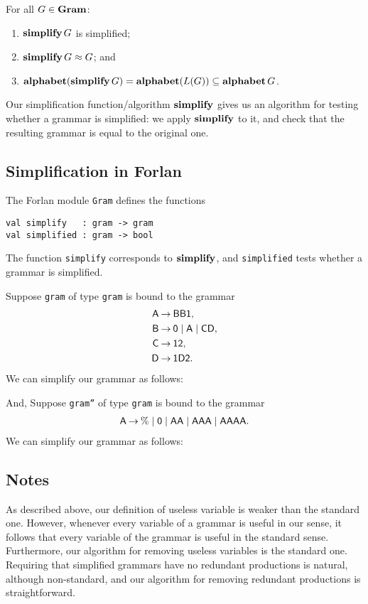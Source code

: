 \begin{theorem}
For all $G\in\mathbf{Gram}$:
\begin{enumerate}[\quad(1)]
\item $\mathbf{simplify}\,G$ is simplified;

\item $\mathbf{simplify}\,G\approx G$; and

\item $\mathbf{alphabet}(\mathbf{simplify}\,G) = \mathbf{alphabet}(L(G)) \subseteq\mathbf{alphabet}\,G$.
\end{enumerate}
\end{theorem}

Our simplification function/algorithm $\mathbf{simplify}$ gives us an
algorithm for testing whether a grammar is simplified: we apply
$\mathbf{simplify}$ to it, and check that the resulting grammar is equal to
the original one.

\subsection{Simplification in Forlan}

The Forlan module \texttt{Gram} defines the functions
\begin{verbatim}
val simplify   : gram -> gram
val simplified : gram -> bool
\end{verbatim}
The function \texttt{simplify} corresponds to $\mathbf{simplify}$, and
\texttt{simplified} tests whether a grammar is simplified.

Suppose \texttt{gram} of type \texttt{gram} is bound to the grammar
\begin{align*}
\mathsf{A} &\mathbin{\to} \mathsf{BB1}, \\
\mathsf{B} &\mathbin{\to} \mathsf{0}\mid\mathsf{A}\mid\mathsf{C}\mathsf{D}, \\
\mathsf{C} &\mathbin{\to} \mathsf{1}\mathsf{2} , \\
\mathsf{D} &\mathbin{\to} \mathsf{1}\mathsf{D}\mathsf{2} .
\end{align*}
We can simplify our grammar as follows:

And, Suppose \texttt{gram''} of type \texttt{gram} is bound to the grammar
\begin{align*}
\mathsf{A} \mathbin{\to} \% \mid \mathsf{0} \mid \mathsf{AA} \mid \mathsf{AAA} \mid
\mathsf{AAAA} .
\end{align*}
We can simplify our grammar as follows:


\subsection{Notes}

As described above, our definition of useless variable is weaker than
the standard one.  However, whenever every variable of a grammar is
useful in our sense, it follows that every variable of the grammar is
useful in the standard sense.  Furthermore, our algorithm for removing
useless variables is the standard one.  Requiring that simplified
grammars have no redundant productions is natural, although
non-standard, and our algorithm for removing redundant productions is
straightforward.

